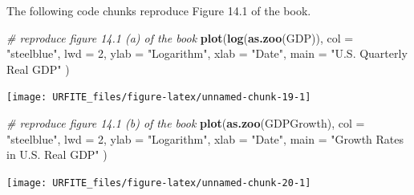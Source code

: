 \documentclass[]{book}
\newenvironment{Shaded}{\begin{snugshade}}{\end{snugshade}}
\newcommand{\KeywordTok}[1]{\textcolor[rgb]{0.13,0.29,0.53}{\textbf{#1}}}
\newcommand{\DataTypeTok}[1]{\textcolor[rgb]{0.13,0.29,0.53}{#1}}
\newcommand{\DecValTok}[1]{\textcolor[rgb]{0.00,0.00,0.81}{#1}}
\newcommand{\StringTok}[1]{\textcolor[rgb]{0.31,0.60,0.02}{#1}}
\newcommand{\CommentTok}[1]{\textcolor[rgb]{0.56,0.35,0.01}{\textit{#1}}}
\newcommand{\OperatorTok}[1]{\textcolor[rgb]{0.81,0.36,0.00}{\textbf{#1}}}
\newcommand{\NormalTok}[1]{#1}
\theoremstyle{definition}
\theoremstyle{definition}
\theoremstyle{definition}
\theoremstyle{remark}
\begin{document}
\begin{Shaded}
\end{Shaded}

The following code chunks reproduce Figure 14.1 of the book.

\begin{Shaded}
\begin{Highlighting}[]
\CommentTok{# reproduce figure 14.1 (a) of the book}
\KeywordTok{plot}\NormalTok{(}\KeywordTok{log}\NormalTok{(}\KeywordTok{as.zoo}\NormalTok{(GDP)),}
     \DataTypeTok{col =} \StringTok{"steelblue"}\NormalTok{,}
     \DataTypeTok{lwd =} \DecValTok{2}\NormalTok{,}
     \DataTypeTok{ylab =} \StringTok{"Logarithm"}\NormalTok{,}
     \DataTypeTok{xlab =} \StringTok{"Date"}\NormalTok{,}
     \DataTypeTok{main =} \StringTok{"U.S. Quarterly Real GDP"}
\NormalTok{     )}
\end{Highlighting}
\end{Shaded}

\begin{center}\texttt{[image: URFITE\_files/figure-latex/unnamed-chunk-19-1]} \end{center}

\begin{Shaded}
\begin{Highlighting}[]
\CommentTok{# reproduce figure 14.1 (b) of the book}
\KeywordTok{plot}\NormalTok{(}\KeywordTok{as.zoo}\NormalTok{(GDPGrowth),}
     \DataTypeTok{col =} \StringTok{"steelblue"}\NormalTok{,}
     \DataTypeTok{lwd =} \DecValTok{2}\NormalTok{,}
     \DataTypeTok{ylab =} \StringTok{"Logarithm"}\NormalTok{,}
     \DataTypeTok{xlab =} \StringTok{"Date"}\NormalTok{,}
     \DataTypeTok{main =} \StringTok{"Growth Rates in U.S. Real GDP"}
\NormalTok{     )}
\end{Highlighting}
\end{Shaded}

\begin{center}\texttt{[image: URFITE\_files/figure-latex/unnamed-chunk-20-1]} \end{center}
\end{document}
